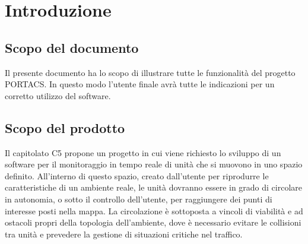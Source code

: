 \section{Introduzione}
\subsection{Scopo del documento}
    Il presente documento ha lo scopo di illustrare tutte le funzionalità del progetto PORTACS. In questo modo l'utente finale avrà tutte le indicazioni per un corretto utilizzo del software.


\subsection{Scopo del prodotto}

    Il capitolato C5 propone un progetto in cui viene richiesto lo sviluppo di un software per il monitoraggio in tempo reale di unità che si muovono in uno spazio definito. All'interno di questo spazio, creato dall'utente per riprodurre le caratteristiche di un ambiente reale, le unità dovranno essere in grado di circolare in autonomia, o sotto il controllo dell'utente, per raggiungere dei punti di interesse posti nella mappa. La circolazione è sottoposta a vincoli di viabilità e ad ostacoli propri della topologia dell'ambiente, dove è necessario evitare le collisioni tra unità e prevedere la gestione di situazioni critiche nel traffico.

